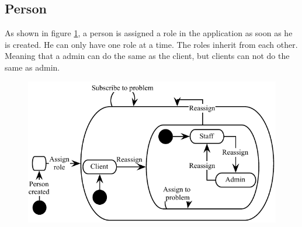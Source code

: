 \subsection{Person}
As shown in figure \ref{fig:Klasse_diagram_person}, a person is assigned a role in the application as soon as he is created. 
He can only have one role at a time. 
The roles inherit from each other. 
Meaning that a admin can do the same as the client, but clients can not do the same as admin. 
\begin{figure}[H]
\begin{center}
\includegraphics[scale=1]{input/problem_domain_analysis/Klassediagram_person.pdf}
\label{fig:Klasse_diagram_person}
\end{center}
\end{figure}